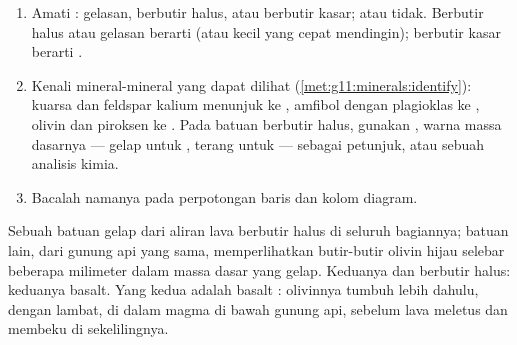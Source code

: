 
\begin{method}\label{met:g11:igneous-rocks:naming}
\begin{enumerate}
  \item Amati : gelasan, berbutir halus, atau berbutir kasar;
         atau tidak. Berbutir halus atau gelasan berarti 
        (atau  kecil yang cepat mendingin); berbutir kasar berarti
        .
  \item Kenali mineral-mineral yang dapat dilihat
        (\cref{met:g11:minerals:identify}): kuarsa dan feldspar kalium
        menunjuk ke , amfibol dengan plagioklas ke , olivin
        dan piroksen ke . Pada batuan berbutir halus, gunakan
        , warna massa dasarnya --- gelap untuk , terang untuk
         --- sebagai petunjuk, atau sebuah analisis kimia.
  \item Bacalah namanya pada perpotongan baris dan kolom diagram.
\end{enumerate}
\end{method}

\begin{example}
Sebuah batuan gelap dari aliran lava berbutir halus di seluruh bagiannya;
batuan lain, dari gunung api yang sama, memperlihatkan butir-butir olivin hijau
selebar beberapa milimeter dalam massa dasar yang gelap. Keduanya  dan
berbutir halus: keduanya basalt. Yang kedua adalah basalt :
olivinnya tumbuh lebih dahulu, dengan lambat, di dalam magma di bawah gunung
api, sebelum lava meletus dan membeku di sekelilingnya.
\end{example}

